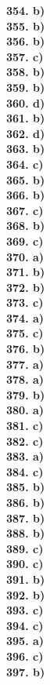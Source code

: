 \documentclass[8pt]{extarticle}
\begin{document}
\begin{multicols}{8}
\textbf{354. b)} \\
\textbf{355. b)} \\
\textbf{356. b)} \\
\textbf{357. c)} \\
\textbf{358. b)} \\
\textbf{359. b)} \\
\textbf{360. d)} \\
\textbf{361. b)} \\
\textbf{362. d)} \\
\textbf{363. b)} \\
\textbf{364. c)} \\
\textbf{365. b)} \\
\textbf{366. b)} \\
\textbf{367. c)} \\
\textbf{368. b)} \\
\textbf{369. c)} \\
\textbf{370. a)} \\
\textbf{371. b)} \\
\textbf{372. b)} \\
\textbf{373. c)} \\
\textbf{374. a)} \\
\textbf{375. c)} \\
\textbf{376. b)} \\
\textbf{377. a)} \\
\textbf{378. a)} \\
\textbf{379. b)} \\
\textbf{380. a)} \\
\textbf{381. c)} \\
\textbf{382. c)} \\
\textbf{383. a)} \\
\textbf{384. c)} \\
\textbf{385. b)} \\
\textbf{386. b)} \\
\textbf{387. b)} \\
\textbf{388. b)} \\
\textbf{389. c)} \\
\textbf{390. c)} \\
\textbf{391. b)} \\
\textbf{392. b)} \\
\textbf{393. c)} \\
\textbf{394. c)} \\
\textbf{395. a)} \\
\textbf{396. c)} \\
\textbf{397. b)} \\

\end{multicols}
\end{document}
